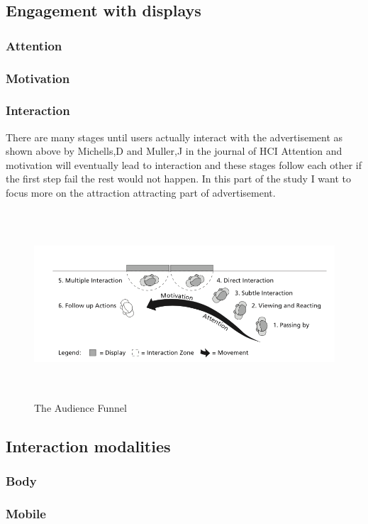 \subsection{Engagement with displays}
\subsubsection{Attention}
\subsubsection{Motivation}
\subsubsection{Interaction}
\newpage
There are many stages until users actually interact with the advertisement as shown above by Michells,D and Muller,J in the journal of HCI \cite{AudienceFunnel} Attention and motivation will eventually lead to interaction and these stages follow each other if the first step fail the rest would not happen. In this part of the study I want to focus more on the attraction attracting part of advertisement.

\begin{figure}[htp]
\centering
\includegraphics[width=120mm,height=70mm]{Figures/3/TheAudienceFunnel}
\caption{The Audience Funnel}
\label{fig:audience_funnel}
\end{figure}


\subsection{Interaction modalities}
\subsubsection{Body}
\subsubsection{Mobile}

